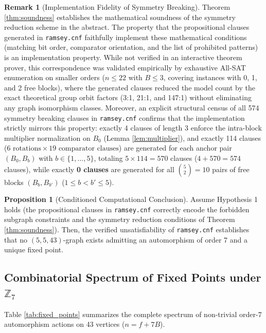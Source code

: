 \documentclass[11pt,a4paper]{article}
\theoremstyle{definition}
\newtheorem{proposition}{Proposition}
\newtheorem{remark}{Remark}
\begin{document}
\begin{remark}[Implementation Fidelity of Symmetry Breaking]
Theorem \ref{thm:soundness} establishes the mathematical soundness of the symmetry reduction scheme in the abstract. The property that the propositional clauses generated in \texttt{ramsey.cnf} faithfully implement these mathematical conditions (matching bit order, comparator orientation, and the list of prohibited patterns) is an implementation property. While not verified in an interactive theorem prover, this correspondence was validated empirically by exhaustive All-SAT enumeration on smaller orders ($n \le 22$ with $B \le 3$, covering instances with 0, 1, and 2 free blocks), where the generated clauses reduced the model count by the exact theoretical group orbit factors (3:1, 21:1, and 147:1) without eliminating any graph isomorphism classes.
Moreover, an explicit structural census of all 574 symmetry breaking clauses in \texttt{ramsey.cnf} confirms that the implementation strictly mirrors this property: exactly 4 clauses of length 3 enforce the intra-block multiplier normalization on $B_0$ (Lemma \ref{lem:multiplier}), and exactly 114 clauses ($6 \text{ rotations} \times 19 \text{ comparator clauses}$) are generated for each anchor pair $(B_0, B_b)$ with $b \in \{1, \dots, 5\}$, totaling $5 \times 114 = 570$ clauses ($4 + 570 = 574$ clauses), while exactly \textbf{0 clauses} are generated for all $\binom{5}{2} = 10$ pairs of free blocks $(B_b, B_{b'})$ ($1 \le b < b' \le 5$).
\end{remark}

\begin{proposition}[Conditioned Computational Conclusion]
Assume Hypothesis 1 holds (the propositional clauses in \texttt{ramsey.cnf} correctly encode the forbidden subgraph constraints and the symmetry reduction conditions of Theorem \ref{thm:soundness}). Then, the verified unsatisfiability of \texttt{ramsey.cnf} establishes that no $(5,5,43)$-graph exists admitting an automorphism of order 7 and a unique fixed point.
\end{proposition}

\subsection{Combinatorial Spectrum of Fixed Points under \texorpdfstring{$\mathbb{Z}_7$}{Z7}}

Table \ref{tab:fixed_points} summarizes the complete spectrum of non-trivial order-7 automorphism actions on 43 vertices ($n = f + 7B$).
\end{document}

